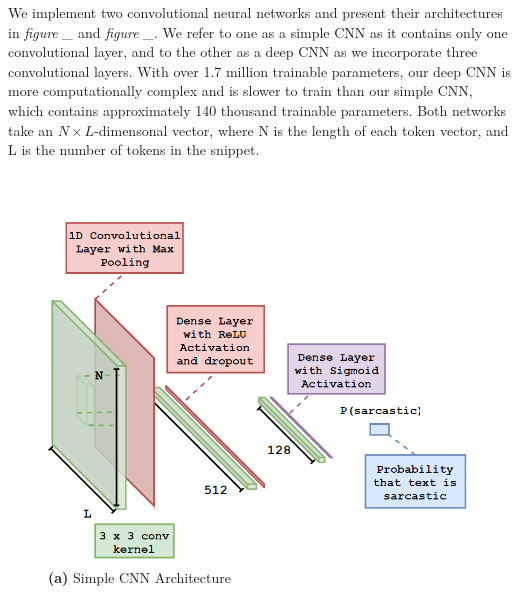 \documentclass[12pt,a4paper]{article}
\begin{document}
\noindent We implement two convolutional neural networks and present their architectures in \textit{figure \_} and \textit{figure \_}. We refer to one as a simple CNN as it contains only one convolutional layer, and to the other as a deep CNN as we incorporate three convolutional layers. With over 1.7 million trainable parameters, our deep CNN is more computationally complex and is slower to train than our simple CNN, which contains approximately 140 thousand trainable parameters. Both networks take an $N \times L$-dimensonal vector, where N is the length of each token vector, and L is the number of tokens in the snippet.\vspace{-16pt}

\hspace{-20pt}\begin{minipage}{0.4\textwidth}
	\begin{figure}[H]
		\includegraphics[width=1\textwidth]{Images/CNNarchNew.png}
		\centering\textbf{(a)} Simple CNN Architecture\\
	\end{figure}
\end{minipage}
\hspace{10pt}
\end{document}
